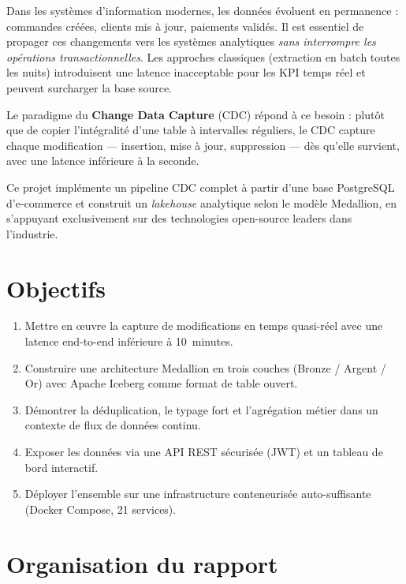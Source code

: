 \documentclass[12pt,a4paper]{report}
\begin{document}
Dans les systèmes d'information modernes, les données évoluent en permanence :
commandes créées, clients mis à jour, paiements validés. Il est essentiel de
propager ces changements vers les systèmes analytiques \emph{sans interrompre
les opérations transactionnelles}. Les approches classiques (extraction en
batch toutes les nuits) introduisent une latence inacceptable pour les KPI
temps réel et peuvent surcharger la base source.

Le paradigme du \textbf{Change Data Capture} (CDC) répond à ce besoin : plutôt
que de copier l'intégralité d'une table à intervalles réguliers, le CDC capture
chaque modification --- insertion, mise à jour, suppression --- dès qu'elle
survient, avec une latence inférieure à la seconde.

Ce projet implémente un pipeline CDC complet à partir d'une base PostgreSQL
d'e-commerce et construit un \textit{lakehouse} analytique selon le modèle
Medallion, en s'appuyant exclusivement sur des technologies open-source
leaders dans l'industrie.

\section{Objectifs}

\begin{enumerate}
    \item Mettre en \oe{}uvre la capture de modifications en temps quasi-réel
          avec une latence end-to-end inférieure à 10~minutes.
    \item Construire une architecture Medallion en trois couches (Bronze /
          Argent / Or) avec Apache Iceberg comme format de table ouvert.
    \item Démontrer la déduplication, le typage fort et l'agrégation métier
          dans un contexte de flux de données continu.
    \item Exposer les données via une API REST sécurisée (JWT) et un tableau
          de bord interactif.
    \item Déployer l'ensemble sur une infrastructure conteneurisée
          auto-suffisante (Docker Compose, 21 services).
\end{enumerate}

\section{Organisation du rapport}
\end{document}
